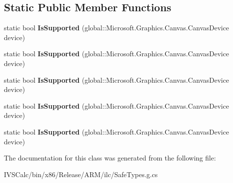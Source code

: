 \subsection*{Static Public Member Functions}
\begin{DoxyCompactItemize}
\item 
\mbox{\label{class_microsoft_1_1_graphics_1_1_canvas_1_1_canvas_sprite_batch_afdfaf00a507ff64861c209d659418ea4}} 
static bool {\bfseries Is\+Supported} (global\+::\+Microsoft.\+Graphics.\+Canvas.\+Canvas\+Device device)
\item 
\mbox{\label{class_microsoft_1_1_graphics_1_1_canvas_1_1_canvas_sprite_batch_afdfaf00a507ff64861c209d659418ea4}} 
static bool {\bfseries Is\+Supported} (global\+::\+Microsoft.\+Graphics.\+Canvas.\+Canvas\+Device device)
\item 
\mbox{\label{class_microsoft_1_1_graphics_1_1_canvas_1_1_canvas_sprite_batch_afdfaf00a507ff64861c209d659418ea4}} 
static bool {\bfseries Is\+Supported} (global\+::\+Microsoft.\+Graphics.\+Canvas.\+Canvas\+Device device)
\item 
\mbox{\label{class_microsoft_1_1_graphics_1_1_canvas_1_1_canvas_sprite_batch_afdfaf00a507ff64861c209d659418ea4}} 
static bool {\bfseries Is\+Supported} (global\+::\+Microsoft.\+Graphics.\+Canvas.\+Canvas\+Device device)
\item 
\mbox{\label{class_microsoft_1_1_graphics_1_1_canvas_1_1_canvas_sprite_batch_afdfaf00a507ff64861c209d659418ea4}} 
static bool {\bfseries Is\+Supported} (global\+::\+Microsoft.\+Graphics.\+Canvas.\+Canvas\+Device device)
\end{DoxyCompactItemize}


The documentation for this class was generated from the following file\+:\begin{DoxyCompactItemize}
\item 
I\+V\+S\+Calc/bin/x86/\+Release/\+A\+R\+M/ilc/Safe\+Types.\+g.\+cs\end{DoxyCompactItemize}
